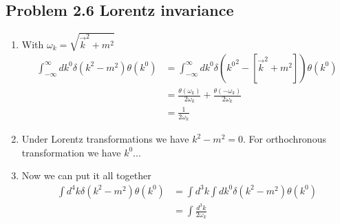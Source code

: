 \documentclass[10pt,a4paper]{book}
\theoremstyle{definition}
\begin{document}
\subsection{Problem 2.6 Lorentz invariance}
\begin{enumerate}
    \item With $\omega_k=\sqrt{\vec{k}^2+m^2}$
    \begin{align}
        \int_{-\infty}^\infty dk^0\delta(k^2-m^2)\theta(k^0)
        &=\int_{-\infty}^\infty dk^0\delta({k^0}^2-[\vec{k}^2+m^2])\theta(k^0)\\
        &=\frac{\theta(\omega_k)}{2\omega_k}+\frac{\theta(-\omega_k)}{2\omega_k}\\
        &=\frac{1}{2\omega_k}
    \end{align}
    \item Under Lorentz transformations we have $k^2-m^2=0$. For orthochronous transformation we have $k^0 ...$
    \item Now we can put it all together
    \begin{align}
        \int d^4k\delta(k^2-m^2)\theta(k^0)
        &=\int d^3k\int dk^0\delta(k^2-m^2)\theta(k^0)\\
        &=\int\frac{d^3k}{2\omega_k}
    \end{align}
\end{enumerate}
\end{document}
